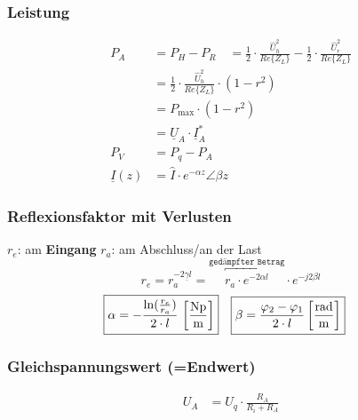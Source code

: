 \subsubsection{Leistung}
\begin{align*}
	P_{A}            & = P_{H}-P_{R}
	\quad = \frac{1}{2} \cdot \frac{\hat{U}_{h}^{2}}{Re\{Z_{L}\}}-\frac{1}{2} \cdot \frac{\hat{U}_{r}^{2}}{Re\{Z_{L}\}} \\
	                 & =\frac{1}{2} \cdot \frac{\hat{U}_{h}^{2}}{Re\{Z_{L}\}} \cdot\left(1-r^{2}\right)                 \\
	                 & = P_{\max} \cdot\left(1-r^{2}\right)                                                             \\
	                 & = \underline{U}_A\cdot\underline{I}_A^*                                                          \\
	P_V              & = P_q -P_A                                                                                       \\
	\underline{I}(z) & = \hat{I}\cdot e^{-\alpha z}\angle \beta z
\end{align*}

\subsubsection{Reflexionsfaktor mit Verlusten}
$ r_e $: am \textbf{Eingang} \qquad $ r_a $: am Abschluss/an der Last
\[
	r_e = r_a  ^{-2\underline{\gamma} l} =  \overbracket{r_a \cdot e^{-2\alpha l}}^ \texttt{gedämpfter Betrag} \cdot e^{-j2\beta l}
\]
\begin{align*}
	\Aboxed{\alpha & = -\frac{\ln(\frac{r_e}{r_a})}{2 \cdot l} \, \left[ \frac{\si{Np}}{\si{m}} \right]  } & \Aboxed{\beta & = \dfrac{\varphi_2 -\varphi_1}{2\cdot l} \left[ \frac{\si{rad}}{\si{m}} \right] }
\end{align*}

\subsubsection{Gleichspannungswert (=Endwert)}
\begin{align*}
	U_A & = U_q\cdot\frac{R_A}{R_i+R_A}
\end{align*}

